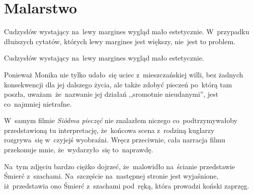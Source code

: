 \documentclass[a4paper,11pt]{article}
\begin{document}
\newpage
\section{Malarstwo}

\vspace{\spaceTwo}







\start {} Cudzysłów wystający na~lewy margines wygląd mało
estetycznie. W~przypadku dłuższych cytatów, których lewy margines jest
większy, nie~jest to problem.

\vspace{\spaceFour}



\start {} Cudzysłów wystający na~lewy margines wygląd mało
estetycznie.

\vspace{\spaceFour}



\start {} Ponieważ Monika nie tylko udało~się uciec
z~mieszczańskiej willi, bez żadnych konsekwencji dla jej dalszego
życia, ale także zdobyć pieczeń po~którą tam poszła,
uważam~że~nazwanie jej działań ,,sromotnie nieudanymi'', jest
co~najmniej nietrafne.

\vspace{\spaceFour}



\start {} W~samym filmie \textit{Siódma pieczęć} nie znalazłem
niczego co~podtrzymywałoby przedstawioną tu interpretację,
że~końcowa scena z~rodziną kuglarzy rozgrywa~się w~czyjejś
wyobraźni. Wręcz przeciwnie, cała narracja filmu przekonuje mnie,
że~wydarzyło~się to~naprawdę.

\vspace{\spaceFour}



\start {} Na~tym zdjęciu bardzo ciężko dojrzeć, że~malowidło
na~ścianie przedstawie Śmierć z~szachami. Na~szczęście na~następnej
stronie jest wyjaśnione, iż~przedstawia ono Śmierć z~szachami
pod~ręką, która prowadzi koński zaprzęg.

\vspace{\spaceFour}
\end{document}
